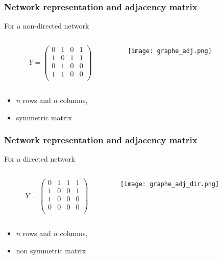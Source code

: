 \documentclass[compress,10pt]{beamer}
\begin{document}
\begin{frame}\frametitle{Network representation and adjacency matrix}
For a non-directed network
 \begin{columns}
 \begin{column}{.45\paperwidth}
$$Y=\left(
\begin{array}{rrrrr}
 0 & 1 & 0 & 1 \\ 
 1 & 0 & 1 & 1 \\ 
 0 & 1 & 0 & 0 \\ 
 1 & 1 & 0 & 0 \\ 
\end{array}\right)
$$
\end{column}

\begin{column}{.5\paperwidth}

\texttt{[image: graphe\_adj.png]}

\end{column}

\end{columns}

\begin{itemize}
\item $n$ rows and $n$ columns,
\item symmetric   matrix
\end{itemize}

\end{frame}
\begin{frame}\frametitle{Network representation and adjacency matrix}
 
For a directed network
 \begin{columns}
 \begin{column}{.45\paperwidth}
$$Y=\left(
\begin{array}{rrrrr}
0 & 1 & 1 & 1 \\ 
 1 & 0 & 0 & 1 \\ 
 1 & 0 & 0 & 0 \\ 
 0 & 0 & 0 & 0 \\ 
\end{array}\right)
$$
\end{column}

\begin{column}{.5\paperwidth}

\texttt{[image: graphe\_adj\_dir.png]}

\end{column}

\end{columns}

\begin{itemize}
\item $n$ rows and $n$ columns,
\item non symmetric   matrix
\end{itemize}

\end{frame}
\end{document}

